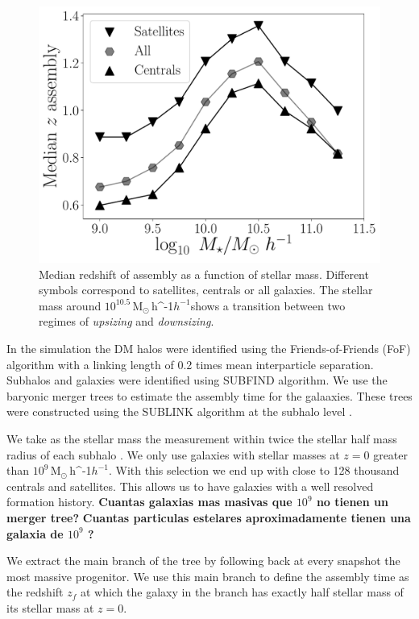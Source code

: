 \documentclass[fleqn,usenatbib]{mnras}
\newcommand{\Msunh}{\,{\rm M}$_{\odot}$\,\ifmmode h^{-1}\else $h^{-1}$\fi}
\begin{document}
\begin{figure}
    \centering
    \includegraphics[width=1\columnwidth]{figuras/median_assembly.pdf}
    \caption{Median redshift of assembly as a function of stellar mass.
    Different symbols correspond to satellites, centrals or all galaxies.
    The stellar mass around $10^{10.5}$\Msunh shows a transition between two 
    regimes of \emph{upsizing} and \emph{downsizing}.}
    \label{fig:median_assembly}
\end{figure}


In the simulation the DM halos were identified using the
Friends-of-Friends (FoF) algorithm with a linking length of 0.2 times
mean interparticle separation. 
Subhalos and galaxies were identified using SUBFIND algorithm.
We use the baryonic merger trees to estimate the assembly time for the
galaaxies.
These trees were constructed using the SUBLINK algorithm at the
subhalo level \citep{2015MNRAS.449...49R}.

We take as the stellar mass the measurement within
twice the stellar half mass radius of each subhalo
\citep{2018MNRAS.475..676S}.
We only use galaxies with stellar masses at $z=0$ greater than
$10^{9}$\Msunh.
With this selection we end up with close to 128 thousand centrals
and  satellites.
This allows us to have galaxies with a well resolved formation
history. 
\textbf{Cuantas galaxias mas masivas que $10^9$ no tienen un merger
  tree?}  
\textbf{Cuantas particulas estelares aproximadamente tienen una
  galaxia de $10^9$ ?} 

We extract the main branch of the tree by following back at every
snapshot the most massive progenitor.
We use this main branch to define the assembly time as the redshift
$z_{f}$ at which the galaxy in the branch has exactly half stellar mass
of its stellar mass at $z=0$.  
\end{document}
